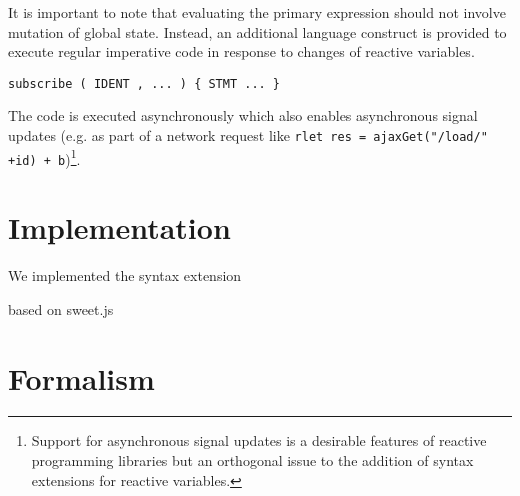 \documentclass{sig-alternate-05-2015}
\begin{document}
It is important to note that evaluating the primary expression should not involve mutation of global state.  Instead, an additional language construct is provided to execute regular imperative code in response to changes of reactive variables.

\begin{lstlisting}
subscribe ( IDENT , ... ) { STMT ... }\end{lstlisting}

The code is executed asynchronously which also enables asynchronous signal updates (e.g. as part of a network request like \lstinline|rlet res = ajaxGet("/load/" +id) + b|)\footnote{Support for asynchronous signal updates is a desirable features of reactive programming libraries but an orthogonal issue to the addition of syntax extensions for reactive variables.}.

\section{Implementation}



We implemented the syntax extension

based on sweet.js~\cite{disney2014}

\section{Formalism}
\end{document}
